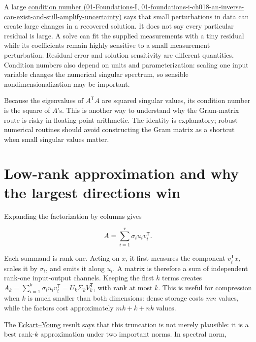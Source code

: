 A large \href{../01-Foundations-I/main.pdf\#nameddest=01-foundations-i-ch018-an-inverse-can-exist-and-still-amplify-uncertainty}{condition number (01-Foundations-I, 01-foundations-i-ch018-an-inverse-can-exist-and-still-amplify-uncertainty)} says that small perturbations in data can create large changes in a recovered solution. It does not say every particular residual is large. A solve can fit the supplied measurements with a tiny residual while its coefficients remain highly sensitive to a small measurement perturbation. Residual error and solution sensitivity are different quantities. Condition numbers also depend on units and parameterization: scaling one input variable changes the numerical singular spectrum, so sensible nondimensionalization may be important.

Because the eigenvalues of \(A^\mathsf T A\) are squared singular values, its condition number is the square of \(A\)'s. This is another way to understand why the Gram-matrix route is risky in floating-point arithmetic. The identity is explanatory; robust numerical routines should avoid constructing the Gram matrix as a shortcut when small singular values matter.

\section{Low-rank approximation and why the largest directions win}\label{02-foundations-ii-ch024-low-rank-approximation-and-why-the-largest-directions-win}

Expanding the factorization by columns gives

\[
A=\sum_{i=1}^{r}\sigma_i u_i v_i^\mathsf T.
\]

Each summand is rank one. Acting on \(x\), it first measures the component \(v_i^\mathsf T x\), scales it by \(\sigma_i\), and emits it along \(u_i\). A matrix is therefore a sum of independent rank-one input-output channels. Keeping the first \(k\) terms creates \(A_k=\sum_{i=1}^k\sigma_i u_i v_i^\mathsf T=U_k\Sigma_kV_k^\mathsf T\), with rank at most \(k\). This is useful for \hyperref[02-foundations-ii-ch024-full-thin-and-compact-shapes-for-tall-and-wide-matrices]{compression} when \(k\) is much smaller than both dimensions: dense storage costs \(mn\) values, while the factors cost approximately \(mk+k+nk\) values.

The \hyperref[02-foundations-ii-ch024-full-thin-and-compact-shapes-for-tall-and-wide-matrices]{Eckart--Young} result says that this truncation is not merely plausible: it is a best rank-\(k\) approximation under two important norms. In spectral norm,

